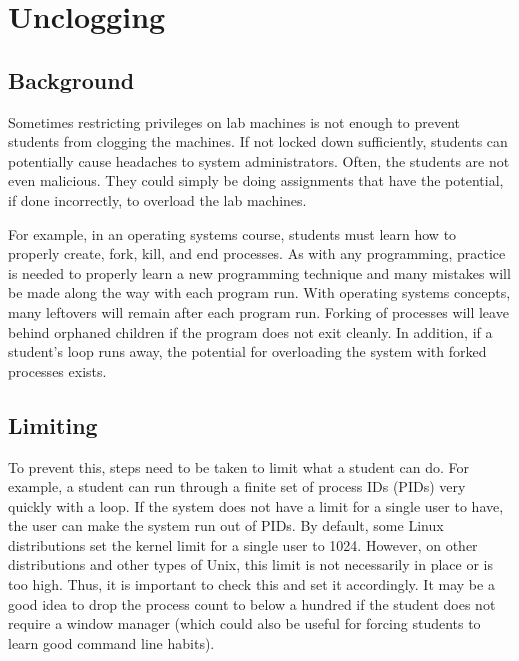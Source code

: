 \section{Unclogging}\label{sec:unclogging}
\subsection{Background}
Sometimes restricting privileges on lab machines is not enough to prevent students from clogging the machines.  If not locked down sufficiently, students can potentially cause headaches to system administrators.  Often, the students are not even malicious.  They could simply be doing assignments that have the potential, if done incorrectly, to overload the lab machines.

For example, in an operating systems course, students must learn how to properly create, fork, kill, and end processes.  As with any programming, practice is needed to properly learn a new programming technique and many mistakes will be made along the way with each program run.  With operating systems concepts, many leftovers will remain after each program run.  Forking of processes will leave behind orphaned children if the program does not exit cleanly.  In addition, if a student's loop runs away, the potential for overloading the system with forked processes exists.  
\subsection{Limiting}
To prevent this, steps need to be taken to limit what a student can do.  For example, a student can run through a finite set of process IDs (PIDs) very quickly with a loop.  If the system does not have a limit for a single user to have, the user can make the system run out of PIDs.  By default, some Linux distributions set the kernel limit for a single user to 1024.  However, on other distributions and other types of Unix, this limit is not necessarily in place or is too high.  Thus, it is important to check this and set it accordingly.  It may be a good idea to drop the process count to below a hundred if the student does not require a window manager (which could also be useful for forcing students to learn good command line habits).  

